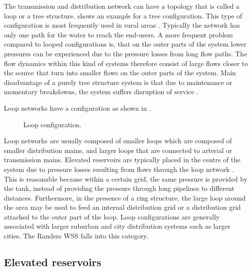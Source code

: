 The transmission and distribution network can have a topology that is called a loop or a tree structure.  shows an example for a tree configuration. This type of configuration is most frequently used in rural areas \cite{mays}. Typically the network has only one path for the water to reach the end-users. A more frequent problem compared to looped configurations is, that on the outer parts of the system lower pressures can be experienced due to the pressure losses from long flow paths. The flow dynamics within this kind of systems therefore consist of large flows closer to the source that turn into smaller flows on the outer parts of the system. Main disadvantage of a purely tree structure system is that due to maintenance or momentary breakdowns, the system suffers disruption of service \cite{mays}. 

Loop networks have a configuration as shown in . 

\begin{figure}[H]
\centering
 
\caption{Loop configuration.}
\label{fig:loop_configuration}
\end{figure}

\vspace{-3mm}

Loop networks are usually composed of smaller loops which are composed of smaller distribution mains, and larger loops that are connected to arterial or transmission mains. Elevated reservoirs are typically placed in the centre of the system due to pressure losses resulting from flows through the loop network \cite{council2007drinking}. This is reasonable because within a certain grid, the same pressure is provided by the tank, instead of providing the pressure through long pipelines to different distances. Furthermore, in the presence of a ring structure, the large loop around the area may be used to feed an internal distribution grid or a distribution grid attached to the outer part of the loop. Loop configurations are generally associated with larger suburban and city distribution systems such as larger cities\cite{council2007drinking}. The Randers WSS falls into this category. 

\subsection{Elevated reservoirs}
\label{elevated_reservoirs}

